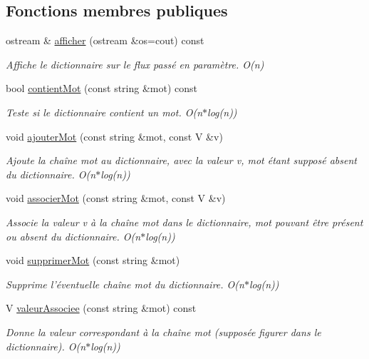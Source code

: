 \subsection*{Fonctions membres publiques}
\begin{DoxyCompactItemize}
\item 
ostream \& \hyperlink{classtree__dictionnaire_af8386fa4ca1a5d86ca73d2e1f7845999}{afficher} (ostream \&os=cout) const 
\begin{DoxyCompactList}\small\item\em Affiche le dictionnaire sur le flux passé en paramètre. O(n) \end{DoxyCompactList}\item 
bool \hyperlink{classtree__dictionnaire_a688203a2da7bbc1bdb667868ef6e18a3}{contient\-Mot} (const string \&mot) const 
\begin{DoxyCompactList}\small\item\em Teste si le dictionnaire contient un mot. O(n$\ast$log(n)) \end{DoxyCompactList}\item 
void \hyperlink{classtree__dictionnaire_a867e2a62ee1defe00f00c08e170192d1}{ajouter\-Mot} (const string \&mot, const V \&v)
\begin{DoxyCompactList}\small\item\em Ajoute la chaîne mot au dictionnaire, avec la valeur v, mot étant supposé absent du dictionnaire. O(n$\ast$log(n)) \end{DoxyCompactList}\item 
void \hyperlink{classtree__dictionnaire_afc52a48eea27916d31c7088813e83fd0}{associer\-Mot} (const string \&mot, const V \&v)
\begin{DoxyCompactList}\small\item\em Associe la valeur v à la chaîne mot dans le dictionnaire, mot pouvant être présent ou absent du dictionnaire. O(n$\ast$log(n)) \end{DoxyCompactList}\item 
void \hyperlink{classtree__dictionnaire_a76fa52ac010b861d437b87d1b68fe0cc}{supprimer\-Mot} (const string \&mot)
\begin{DoxyCompactList}\small\item\em Supprime l'éventuelle chaîne mot du dictionnaire. O(n$\ast$log(n)) \end{DoxyCompactList}\item 
V \hyperlink{classtree__dictionnaire_a7fb5e78b2bf0d5e75c9aebb870d43879}{valeur\-Associee} (const string \&mot) const 
\begin{DoxyCompactList}\small\item\em Donne la valeur correspondant à la chaîne mot (supposée figurer dans le dictionnaire). O(n$\ast$log(n)) \end{DoxyCompactList}\item 

\end{DoxyCompactItemize}
